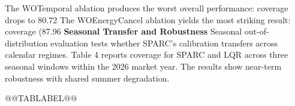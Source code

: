 {The WOTemporal ablation produces the worst overall performance: coverage drops to 80.72%
The WOEnergyCancel ablation yields the most striking result: coverage (87.96%
\textbf{Seasonal Transfer and Robustness}
Seasonal out-of-distribution evaluation tests whether SPARC's calibration transfers across calendar regimes. Table 4 reports coverage for SPARC and LQR across three seasonal windows within the 2026 market year. The results show near-term robustness with shared summer degradation.
\begin{table}[t]
\caption{}
@@TABLABEL@@
\centering
{}
\end{table}}
